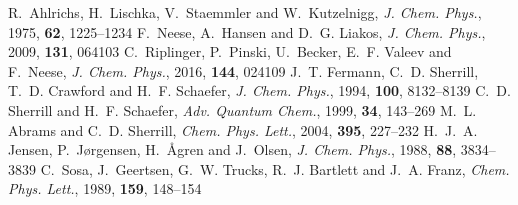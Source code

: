 \documentclass[11pt,article]{achemso}
\begin{document}
\begin{mcitethebibliography}{41}
R.~Ahlrichs, H.~Lischka, V.~Staemmler and W.~Kutzelnigg, \emph{J. Chem. Phys.},
  1975, \textbf{62}, 1225--1234\relax
\mciteBstWouldAddEndPuncttrue
\mciteSetBstMidEndSepPunct{\mcitedefaultmidpunct}
{\mcitedefaultendpunct}{\mcitedefaultseppunct}\relax
\EndOfBibitem
{}
F.~Neese, A.~Hansen and D.~G. Liakos, \emph{J. Chem. Phys.}, 2009,
  \textbf{131}, 064103\relax
\mciteBstWouldAddEndPuncttrue
\mciteSetBstMidEndSepPunct{\mcitedefaultmidpunct}
{\mcitedefaultendpunct}{\mcitedefaultseppunct}\relax
\EndOfBibitem
{}
C.~Riplinger, P.~Pinski, U.~Becker, E.~F. Valeev and F.~Neese, \emph{J. Chem.
  Phys.}, 2016, \textbf{144}, 024109\relax
\mciteBstWouldAddEndPuncttrue
\mciteSetBstMidEndSepPunct{\mcitedefaultmidpunct}
{\mcitedefaultendpunct}{\mcitedefaultseppunct}\relax
\EndOfBibitem
{}
J.~T. Fermann, C.~D. Sherrill, T.~D. Crawford and H.~F. Schaefer, \emph{J.
  Chem. Phys.}, 1994, \textbf{100}, 8132--8139\relax
\mciteBstWouldAddEndPuncttrue
\mciteSetBstMidEndSepPunct{\mcitedefaultmidpunct}
{\mcitedefaultendpunct}{\mcitedefaultseppunct}\relax
\EndOfBibitem
{}
C.~D. Sherrill and H.~F. Schaefer, \emph{Adv. Quantum Chem.}, 1999,
  \textbf{34}, 143--269\relax
\mciteBstWouldAddEndPuncttrue
\mciteSetBstMidEndSepPunct{\mcitedefaultmidpunct}
{\mcitedefaultendpunct}{\mcitedefaultseppunct}\relax
\EndOfBibitem
{}
M.~L. Abrams and C.~D. Sherrill, \emph{Chem. Phys. Lett.}, 2004, \textbf{395},
  227--232\relax
\mciteBstWouldAddEndPuncttrue
\mciteSetBstMidEndSepPunct{\mcitedefaultmidpunct}
{\mcitedefaultendpunct}{\mcitedefaultseppunct}\relax
\EndOfBibitem
{}
H.~J.~A. Jensen, P.~J{\o}rgensen, H.~{\AA}gren and J.~Olsen, \emph{J. Chem.
  Phys.}, 1988, \textbf{88}, 3834--3839\relax
\mciteBstWouldAddEndPuncttrue
\mciteSetBstMidEndSepPunct{\mcitedefaultmidpunct}
{\mcitedefaultendpunct}{\mcitedefaultseppunct}\relax
\EndOfBibitem
{}
C.~Sosa, J.~Geertsen, G.~W. Trucks, R.~J. Bartlett and J.~A. Franz, \emph{Chem.
  Phys. Lett.}, 1989, \textbf{159}, 148--154\relax
\mciteBstWouldAddEndPuncttrue
\mciteSetBstMidEndSepPunct{\mcitedefaultmidpunct}
{\mcitedefaultendpunct}{\mcitedefaultseppunct}\relax

\end{mcitethebibliography}
\end{document}
